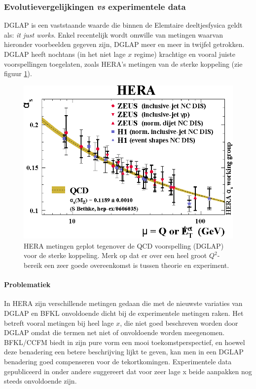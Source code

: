 \documentclass[a4paper,11pt]{article}
\numberwithin{equation}{section} %
\begin{document}
    \subsubsection{Evolutievergelijkingen \textit{vs} experimentele data} \label{sec:QCDvsExperiment}
DGLAP is een vaststaande waarde die binnen de Elemtaire deeltjesfysica geldt als: \textit{it just works}.
Enkel recentelijk wordt omwille van metingen waarvan hieronder voorbeelden gegeven zijn, DGLAP meer en meer in twijfel getrokken.
DGLAP heeft nochtans (in het niet lage $x$ regime) krachtige en vooral juiste voorspellingen toegelaten, zoals HERA’s metingen van de sterke koppeling (zie figuur \ref{fig:SC}).
\begin{figure} [H]
  \begin{center}
    \includegraphics[scale=1]{Afbeeldingen/SC.eps}
    \caption{HERA metingen geplot tegenover de QCD voorspelling (DGLAP) voor de sterke koppeling. Merk op dat er over een heel groot $Q^2$-bereik een zeer goede overeenkomst is tussen theorie en experiment. \cite{Kiesling}}
   \label{fig:SC}
  \end{center}
\end{figure}

      \paragraph{Problematiek}
In HERA zijn verschillende metingen gedaan die met de nieuwste variaties van DGLAP en BFKL onvoldoende dicht bij de experimentele metingen raken.
Het betreft vooral metingen bij heel lage $x$, die niet goed beschreven worden door DGLAP omdat die termen net niet  of onvoldoende worden meegenomen.
BFKL/CCFM biedt in zijn pure vorm een mooi toekomstperspectief, en hoewel deze benadering een betere beschrijving lijkt te geven, kan men in een DGLAP benadering goed compenseren voor de tekortkomingen.
Experimentele data gepubliceerd in onder andere \cite{Kiesling} suggereert dat voor zeer lage x beide aanpakken nog steeds onvoldoende zijn.
\end{document}
